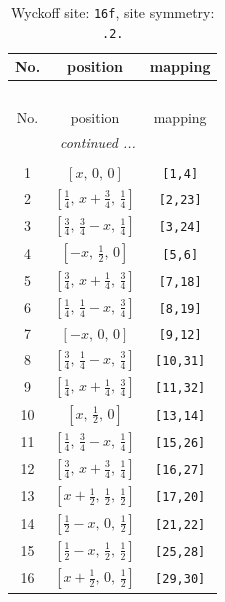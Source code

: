 \documentclass[fleqn,8pt]{jsarticle}
\begin{document}
\begin{longtable}{ccc}
\caption{Wyckoff site: {\tt 16f}, site symmetry: {\tt .2.}}
 \\
 \hline \hline
No. & position & mapping \\ \hline \endfirsthead

\multicolumn{2}{l}{\tablename\ \thetable{}} \\
 \hline \hline
No. & position & mapping \\ \hline \endhead

 \hline \hline
\multicolumn{2}{r}{\footnotesize\it continued ...} \\ \endfoot

 \hline \hline
\multicolumn{2}{r}{} \\ \endlastfoot

1 & $\left[ x,\, 0,\, 0 \right]$ & {\tt [1,4]} \\ \hline
2 & $\left[ \frac{1}{4},\, x + \frac{3}{4},\, \frac{1}{4} \right]$ & {\tt [2,23]} \\ \hline
3 & $\left[ \frac{3}{4},\, \frac{3}{4} - x,\, \frac{1}{4} \right]$ & {\tt [3,24]} \\ \hline
4 & $\left[ - x,\, \frac{1}{2},\, 0 \right]$ & {\tt [5,6]} \\ \hline
5 & $\left[ \frac{3}{4},\, x + \frac{1}{4},\, \frac{3}{4} \right]$ & {\tt [7,18]} \\ \hline
6 & $\left[ \frac{1}{4},\, \frac{1}{4} - x,\, \frac{3}{4} \right]$ & {\tt [8,19]} \\ \hline
7 & $\left[ - x,\, 0,\, 0 \right]$ & {\tt [9,12]} \\ \hline
8 & $\left[ \frac{3}{4},\, \frac{1}{4} - x,\, \frac{3}{4} \right]$ & {\tt [10,31]} \\ \hline
9 & $\left[ \frac{1}{4},\, x + \frac{1}{4},\, \frac{3}{4} \right]$ & {\tt [11,32]} \\ \hline
10 & $\left[ x,\, \frac{1}{2},\, 0 \right]$ & {\tt [13,14]} \\ \hline
11 & $\left[ \frac{1}{4},\, \frac{3}{4} - x,\, \frac{1}{4} \right]$ & {\tt [15,26]} \\ \hline
12 & $\left[ \frac{3}{4},\, x + \frac{3}{4},\, \frac{1}{4} \right]$ & {\tt [16,27]} \\ \hline
13 & $\left[ x + \frac{1}{2},\, \frac{1}{2},\, \frac{1}{2} \right]$ & {\tt [17,20]} \\ \hline
14 & $\left[ \frac{1}{2} - x,\, 0,\, \frac{1}{2} \right]$ & {\tt [21,22]} \\ \hline
15 & $\left[ \frac{1}{2} - x,\, \frac{1}{2},\, \frac{1}{2} \right]$ & {\tt [25,28]} \\ \hline
16 & $\left[ x + \frac{1}{2},\, 0,\, \frac{1}{2} \right]$ & {\tt [29,30]} \\
\end{longtable}
\end{document}
